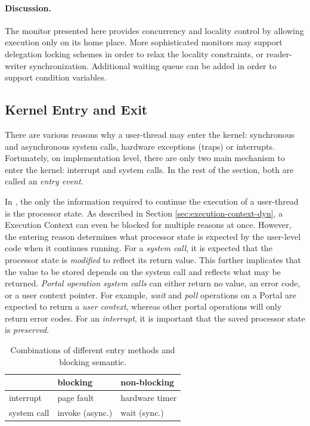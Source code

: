 \paragraph{Discussion.}
The monitor presented here provides concurrency and locality control by allowing execution only on its home place. 
More sophisticated monitors may support delegation locking schemes in order to relax the locality constraints, or reader-writer synchronization. Additional waiting queue can be added in order to support condition variables.


\subsection{Kernel Entry and Exit}
\label{sec:entry-dyn}

There are various reasons why a user-thread may enter the kernel: synchronous and asynchronous system calls, hardware exceptions (traps) or interrupts.
Fortunately, on implementation level, there are only two main mechanism to enter the kernel: interrupt and system calls. In the rest of the section, both are called an \emph{entry event}.

In \mythos, the only the information required to continue the execution of a user-thread is the processor state. As described in Section \ref{sec:execution-context-dyn}, a Execution Context can even be blocked for multiple reasons at once.
However, the entering reason determines what processor state is expected by the user-level code when it continues running.
For a \emph{system call}, it is expected that the processor state is \emph{modified} to reflect its return value. This further implicates that the value to be stored depends on the system call and reflects what may be returned.
\emph{Portal operation system calls}  can either return no value, an error code, or a user context pointer.
For example, \emph{wait} and \emph{poll} operations on a Portal are expected to return a \emph{user context}, whereas other portal operations will only return error codes. 
For an \emph{interrupt}, it is important that the saved processor state is \emph{preserved}.

\begin{table}
\begin{center}
\begin{tabular}{l|ll}
\toprule
 & blocking & non-blocking \\
\midrule
interrupt & page fault & hardware timer \\
system call & invoke (async.) & wait (sync.) \\
\bottomrule
\end{tabular}
\caption{Combinations of different entry methods and blocking semantic.}
\label{tab:entry_block}
\end{center}
\end{table}

